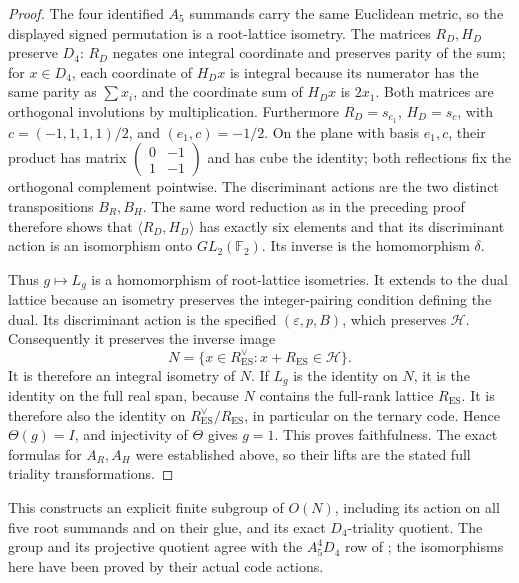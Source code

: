 \begin{proof}
The four identified \(A_5\) summands carry the same Euclidean metric,
so the displayed signed permutation is a root-lattice isometry.  The
matrices \(R_D,H_D\) preserve \(D_4\): \(R_D\) negates one integral
coordinate and preserves parity of the sum; for \(x\in D_4\), each
coordinate of \(H_Dx\) is integral because its numerator has the same
parity as \(\sum x_i\), and the coordinate sum of \(H_Dx\) is \(2x_1\).
Both matrices are orthogonal involutions by multiplication.
Furthermore \(R_D=s_{e_1}\), \(H_D=s_c\), with
\(c=(-1,1,1,1)/2\), and \((e_1,c)=-1/2\).
On the plane with basis \(e_1,c\), their product has matrix
\(\left(\begin{smallmatrix}0&-1\\1&-1\end{smallmatrix}\right)\)
and has cube the identity; both reflections fix the orthogonal
complement pointwise.  The discriminant actions are the two distinct
transpositions \(B_R,B_H\).  The same word reduction as in the preceding
proof therefore shows that \(\langle R_D,H_D\rangle\) has exactly six
elements and that its discriminant action is an isomorphism onto
\(GL_2(\mathbb F_2)\).  Its inverse is the homomorphism \(\delta\).

Thus \(g\mapsto L_g\) is a homomorphism of root-lattice isometries.
It extends to the dual lattice because an isometry preserves the
integer-pairing condition defining the dual.  Its discriminant action is
the specified \((\varepsilon,p,B)\), which preserves \(\mathcal H\).
Consequently it preserves the inverse image
\[
 N=\{x\in R_{\mathrm{ES}}^\vee:
                  x+R_{\mathrm{ES}}\in\mathcal H\}.
\]
It is therefore an integral isometry of \(N\).
If \(L_g\) is the identity on \(N\), it is the identity on the full
real span, because \(N\) contains the full-rank lattice
\(R_{\mathrm{ES}}\).  It is therefore also the identity on
\(R_{\mathrm{ES}}^\vee/R_{\mathrm{ES}}\), in particular on the ternary
code.  Hence \(\Theta(g)=I\), and injectivity of \(\Theta\) gives \(g=1\).
This proves faithfulness.
The exact formulas for \(A_R,A_H\) were established above, so their
lifts are the stated full triality transformations.
\end{proof}

This constructs an explicit finite subgroup of \(O(N)\), including its
action on all five root summands and on their glue, and its exact
\(D_4\)-triality quotient.  The group and its projective quotient agree
with the \(A_5^4D_4\) row of \cite[Table~3, p.~21]{esn:CDH2014};
the isomorphisms here have been proved by their actual code actions.

